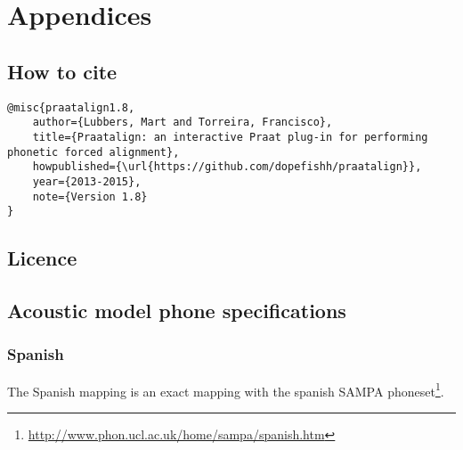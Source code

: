 \chapter{Appendices}
\section{How to cite}
\begin{lstlisting}[caption={Bibtex snippet}]
@misc{praatalign1.8,
	author={Lubbers, Mart and Torreira, Francisco},
	title={Praatalign: an interactive Praat plug-in for performing phonetic forced alignment},
	howpublished={\url{https://github.com/dopefishh/praatalign}},
	year={2013-2015},
	note={Version 1.8}
}
\end{lstlisting}

\section{Licence}


\section{Acoustic model phone specifications}\label{sec:models}
\subsection{Spanish}
\label{sec:phspanish}
The Spanish mapping is an exact mapping with the spanish SAMPA
phoneset\footnote{\url{http://www.phon.ucl.ac.uk/home/sampa/spanish.htm}}.

